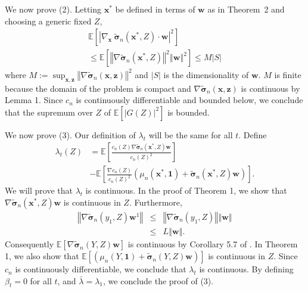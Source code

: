 \documentclass[letterpaper]{article}
\newcommand{\E}{\mathbb{E}}
\newcommand{\stcomment}[1]{{\color{red} PF: #1}}
\newcommand{\pfcomment}[1]{{\color{blue} PF: #1}}
\newcommand{\cost}{c}
\newcommand{\x}{\mathbf{x}}
\renewcommand{\S}{S}
\newcommand{\w}{\mathbf{w}}
\newcommand{\sigmatilde}{\tilde{\mathbf{\sigma}}}
\newcommand{\one}{\mathbf{1}}
\newcommand{\z}{\mathbf{z}}
\theoremstyle{definition}
\numberwithin{equation}{section}
\begin{document}
We now prove (2).  Letting $\x^*$ be defined in terms of $\w$ as in Theorem~2 and choosing a generic fixed $Z$, 
\begin{equation*}
\begin{split}
\E\left[\left|\nabla_\x\ \sigmatilde_{n}\left(\x^*, Z \right) \cdot \w \right|^{2} \right] \\
\leq \E\left[\left\Vert \nabla\sigmatilde_{n}\left(\x^*,Z\right)\right\Vert ^{2}\left\Vert \w \right\Vert ^{2} \right] \leq M |\S|
\end{split}
\end{equation*}
where $M:=\sup_{\x,\z}\left\Vert \nabla\sigmatilde_{n}\left(\x,\z\right)\right\Vert ^{2}$
and $|\S|$ is the dimensionality of $\w$.
$M$ is finite because the domain of the problem is compact and $\nabla\sigmatilde_{n}\left(\x,\z\right)$
is continuous by Lemma 1. Since $\cost_n$ is continuously
differentiable and bounded below, we conclude
that the supremum over $Z$ of $\E\left[\left|G\left(Z\right)\right|^{2}\right]$
is bounded. 


We now prove (3). Our definition of $\lambda_t$ will be the same for all $t$.  Define
\begin{equation*}
\begin{split}
\lambda_{t}\left(Z\right)  &=
\E\left[\frac{\cost_n\left(Z\right)\nabla\sigmatilde_{n}\left(\x^*,Z\right)\w}{\cost_n\left(Z\right)^{2}}\right] \\
&-\E\left[\frac{\nabla \cost_n\left(Z\right)}{\cost_n\left(Z\right)^{2}}\left(\mu_{n}\left(\x^*,\one\right)+\sigmatilde_{n}\left(\x^*,Z\right)\w\right)\right].
\end{split}
\end{equation*}
We will prove that
$\lambda_{t}$ is continuous. In the proof of Theorem 1, we show that
$\nabla\sigmatilde_{n}\left(\x^*,Z\right) \w$ is continuous in
$Z$. Furthermore,
\begin{eqnarray*}
\left\Vert \nabla\sigmatilde_{n}\left(y_{1},Z\right)\w^{1}\right\Vert  & \leq & \left\Vert \nabla\sigmatilde_{n}\left(y_{1},Z\right)\right\Vert \left\Vert \w\right\Vert \\
 & \leq & L\left\Vert \w\right\Vert .
\end{eqnarray*}
Consequently $\E\left[\nabla\sigmatilde_{n}\left(Y,Z\right)\w\right]$
is continuous by Corollary 5.7 of \citet{bartle}. In Theorem 1, we also show
that $\E\left[\left(\mu_{n}\left(Y,\one\right)+\sigmatilde_{n}\left(Y,Z\right)\w\right)\right]$
is continuous in $Z$. Since $\cost_n$ is continuously differentiable,
we conclude that $\lambda_{t}$ is continuous. By defining $\beta_{t}=0$
for all $t$, and $\bar{\lambda}=\lambda_{1}$, we conclude the proof
of (3).
\end{document}
